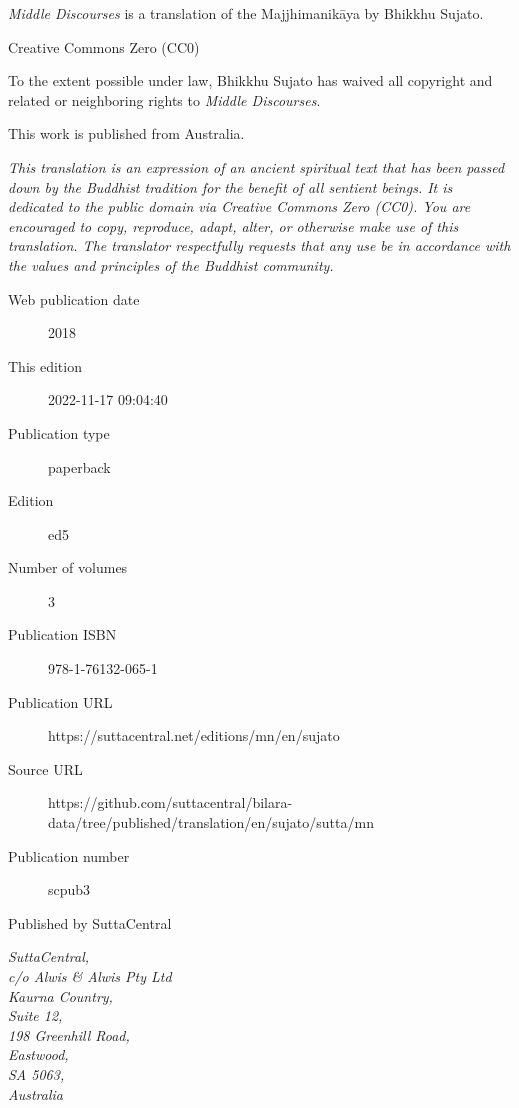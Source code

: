 \documentclass[12pt,openany]{book}%
\begin{document}
\begin{footnotesize}

\textit{Middle Discourses} is a translation of the Majjhimanikāya by Bhikkhu Sujato.

\medskip

Creative Commons Zero (CC0)

To the extent possible under law, Bhikkhu Sujato has waived all copyright and related or neighboring rights to \textit{Middle Discourses}.

\medskip

This work is published from Australia.

\begin{center}
\textit{This translation is an expression of an ancient spiritual text that has been passed down by the Buddhist tradition for the benefit of all sentient beings. It is dedicated to the public domain via Creative Commons Zero (CC0). You are encouraged to copy, reproduce, adapt, alter, or otherwise make use of this translation. The translator respectfully requests that any use be in accordance with the values and principles of the Buddhist community.}
\end{center}

\medskip

\begin{description}
    \item[Web publication date] 2018
    \item[This edition] 2022-11-17 09:04:40
    \item[Publication type] paperback
    \item[Edition] ed5
    \item[Number of volumes] 3
    \item[Publication ISBN] 978-1-76132-065-1
    \item[Publication URL] https://suttacentral.net/editions/mn/en/sujato
    \item[Source URL] https://github.com/suttacentral/bilara-data/tree/published/translation/en/sujato/sutta/mn
    \item[Publication number] scpub3
\end{description}

\medskip

Published by SuttaCentral

\medskip

\textit{SuttaCentral,\\
c/o Alwis \& Alwis Pty Ltd\\
Kaurna Country,\\
Suite 12,\\
198 Greenhill Road,\\
Eastwood,\\
SA 5063,\\
Australia}

\end{footnotesize}
\end{document}
